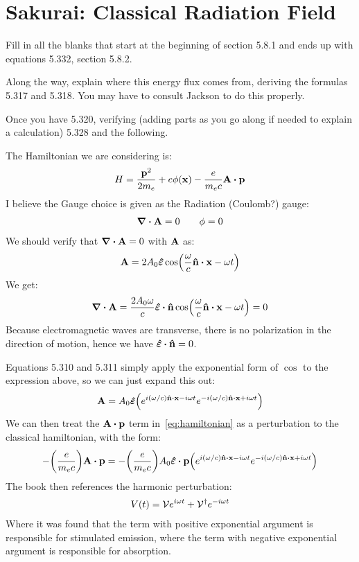 \documentclass[12pt]{article}
\begin{document}
\section{Sakurai: Classical Radiation Field}
\begin{problem}
  Fill in all the blanks that start at the beginning of section 5.8.1 and ends up with equations 5.332, section 5.8.2.

  Along the way, explain where this energy flux comes from, deriving the formulas 5.317 and 5.318. You may have to consult Jackson to do this properly.

  Once you have 5.320, verifying (adding parts as you go along if needed to explain a calculation) 5.328 and the following.
\end{problem}
The Hamiltonian we are considering is:
\begin{equation}
  \label{eq:hamiltonian}
  H=\frac{\vb{p}^2}{2m_e}+e\phi(\vb{x})-\frac{e}{m_e c}\vb{A\vdot p}
\end{equation}
I believe the Gauge choice is given as the Radiation (Coulomb?) gauge:
\begin{align*}
  \div{\vb{A}}=0\qquad \phi=0
\end{align*}
We should verify that $\div{\vb{A}}=0$ with $\vb{A}$ as:
\begin{align*}
  \vb{A}=2A_0\bm{\hat{\veps}}\cos(\frac{\omega}{c}\vu{n}\vdot\vb{x}-\omega t)
\end{align*}
We get:
\begin{align*}
  \div{\vb{A}}=\frac{2A_0\omega}c\bm{\hat{\veps}}\vdot\vu{n}
  \cos(\frac{\omega}{c}\vu{n}\vdot\vb{x}-\omega t)=0
\end{align*}
Because electromagnetic waves are transverse, there is no polarization in the direction of motion, hence we have $\bm{\hat{\veps}}\vdot\vu{n}=0$.

Equations 5.310 and 5.311 simply apply the exponential form of $\cos$ to the expression above, so we can just expand this out:
\begin{align*}
  \vb{A}=A_0\bm{\hat{\veps}}\qty(
  e^{i(\omega/c)\vu{n}\vdot\vb{x}-i\omega t}
  e^{-i(\omega/c)\vu{n}\vdot\vb{x}+i\omega t})
\end{align*}
We can then treat the $\vb{A\vdot p}$ term in~\eqref{eq:hamiltonian} as a perturbation to the classical hamiltonian, with the form:
\begin{align*}
  -\qty(\frac{e}{m_e c})\vb{A\vdot p}=
  -\qty(\frac{e}{m_e c})A_0\bm{\hat{\veps}}\vdot\vb{p}\qty(
  e^{i(\omega/c)\vu{n}\vdot\vb{x}-i\omega t}
  e^{-i(\omega/c)\vu{n}\vdot\vb{x}+i\omega t})
\end{align*}
The book then references the harmonic perturbation:
\begin{align*}
  V(t)=\mathcal{V} e^{i\omega t}+\mathcal{V}^\dag e^{-i\omega t}
\end{align*}
Where it was found that the term with positive exponential argument is responsible for stimulated emission, where the term with negative exponential argument is responsible for absorption.
\end{document}
